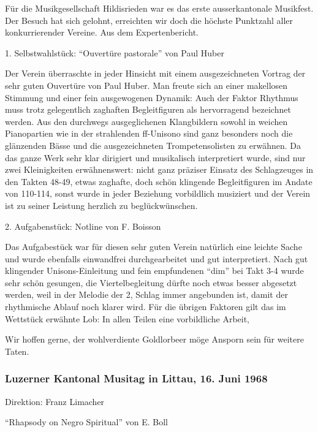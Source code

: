 \begin{history}
    Für die Musikgesellschaft Hildisrieden war es das erste ausserkantonale
    Musikfest. Der Besuch hat sich gelohnt, erreichten wir doch die höchste
    Punktzahl aller konkurrierender Vereine. Aus dem Expertenbericht.

    1. Selbstwahlstück: \enquote{Ouvertüre pastorale} von Paul Huber

    Der Verein überraschte in jeder Hinsicht mit einem ausgezeichneten Vortrag
    der sehr guten Ouvertüre von Paul Huber. Man freute sich an einer makellosen
    Stimmung und einer fein ausgewogenen Dynamik: Auch der Faktor Rhythmus muss
    trotz gelegentlich zaghaften Begleitfiguren als hervorragend bezeichnet
    werden. Aus den durchwegs ausgeglichenen Klangbildern sowohl in weichen
    Pianopartien wie in der strahlenden ff-Unisono sind ganz besonders noch die
    glänzenden Bässe und die ausgezeichneten Trompetensolisten zu erwähnen. Da
    das ganze Werk sehr klar dirigiert und musikalisch interpretiert wurde, sind
    nur zwei Kleinigkeiten erwähnenswert: nicht ganz präziser Einsatz des
    Schlagzeuges in den Takten 48-49, etwas zaghafte, doch schön klingende
    Begleitfiguren im Andate von 110-114, sonst wurde in jeder Beziehung
    vorbildlich musiziert und der Verein ist zu seiner Leistung herzlich zu
    beglückwünschen.

    2. Aufgabenstück: Notline von F. Boisson

    Das Aufgabestück war für diesen sehr guten Verein natürlich eine leichte
    Sache und wurde ebenfalls einwandfrei durchgearbeitet und gut interpretiert.
    Nach gut klingender Unisons-Einleitung und fein empfundenen \enquote{dim}
    bei Takt 3-4 wurde sehr schön gesungen, die Viertelbegleitung dürfte noch
    etwas besser abgesetzt werden, weil in der Melodie der 2, Schlag immer
    angebunden ist, damit der rhythmische Ablauf noch klarer wird. Für die
    übrigen Faktoren gilt das im Wettstück erwähnte Lob: In allen Teilen eine
    vorbildliche Arbeit,

    Wir hoffen gerne, der wohlverdiente Goldlorbeer möge Ansporn sein für
    weitere Taten.


    \subsubsection*{Luzerner Kantonal Musitag in Littau, 16. Juni 1968}

    Direktion: Franz Limacher

    \enquote{Rhapsody on Negro Spiritual} von E. Boll


\end{history}
